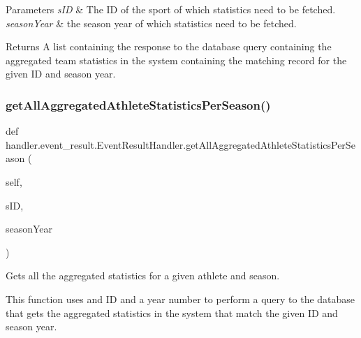 \begin{DoxyParams}{Parameters}
{\em s\+ID} & The ID of the sport of which statistics need to be fetched. \\
\hline
{\em season\+Year} & the season year of which statistics need to be fetched.\\
\hline
\end{DoxyParams}
\begin{DoxyReturn}{Returns}
A list containing the response to the database query containing the aggregated team statistics in the system containing the matching record for the given ID and season year. 
\end{DoxyReturn}
\mbox{\label{classhandler_1_1event__result_1_1_event_result_handler_ac8edd9568d02ac0db0746a48866fefec}} 
\subsubsection{\texorpdfstring{get\+All\+Aggregated\+Athlete\+Statistics\+Per\+Season()}{getAllAggregatedAthleteStatisticsPerSeason()}}
{\footnotesize\ttfamily def handler.\+event\+\_\+result.\+Event\+Result\+Handler.\+get\+All\+Aggregated\+Athlete\+Statistics\+Per\+Season (\begin{DoxyParamCaption}\item[{}]{self,  }\item[{}]{s\+ID,  }\item[{}]{season\+Year }\end{DoxyParamCaption})}



Gets all the aggregated statistics for a given athlete and season. 

This function uses and ID and a year number to perform a query to the database that gets the aggregated statistics in the system that match the given ID and season year.


